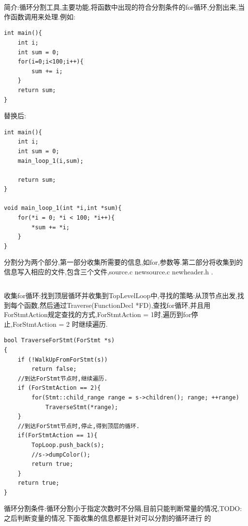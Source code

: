 \section{}
\par{简介:循环分割工具,主要功能,将函数中出现的符合分割条件的for循环,分割出来,当作函数调用来处理.例如:}

\begin{lstlisting}
int main(){
    int i;
    int sum = 0;
    for(i=0;i<100;i++){
        sum += i;
    }
    return sum;
}
\end{lstlisting}

\par{替换后:}
\begin{lstlisting}
int main(){
    int i;
    int sum = 0;
    main_loop_1(i,sum);

    return sum;  
}

void main_loop_1(int *i,int *sum){
    for(*i = 0; *i < 100; *i++){
        *sum += *i;
    }
}
\end{lstlisting}

\par{分割分为两个部分,第一部分收集所需要的信息,如for,参数等.第二部分将收集到的信息写入相应的文件,包含三个文件,source.c newsource.c newheader.h . }
\subsection{}

\par{收集for循环:找到顶层循环并收集到TopLevelLoop中,寻找的策略:从顶节点出发,找到每个函数,然后通过Traverse(FunctionDecl *FD),查找for循环,并且用ForStmtAction规定查找的方式,ForStmtAction = 1时,遍历到for停止,ForStmtAction = 2 时继续遍历.}
\begin{lstlisting}
bool TraverseForStmt(ForStmt *s)
{
    if (!WalkUpFromForStmt(s))
        return false;
    //到达ForStmt节点时,继续遍历.
    if (ForStmtAction == 2){
        for(Stmt::child_range range = s->children(); range; ++range)
            TraverseStmt(*range);
    }
    //到达ForStmt节点时,停止,得到顶层的循环.
    if(ForStmtAction == 1){
        TopLoop.push_back(s);
        //s->dumpColor();
        return true;
    }
    return true;
}
\end{lstlisting}

\par{循环分割条件:循环分割小于指定次数时不分隔,目前只能判断常量的情况,TODO:之后判断变量的情况.下面收集的信息都是针对可以分割的循环进行 的}

